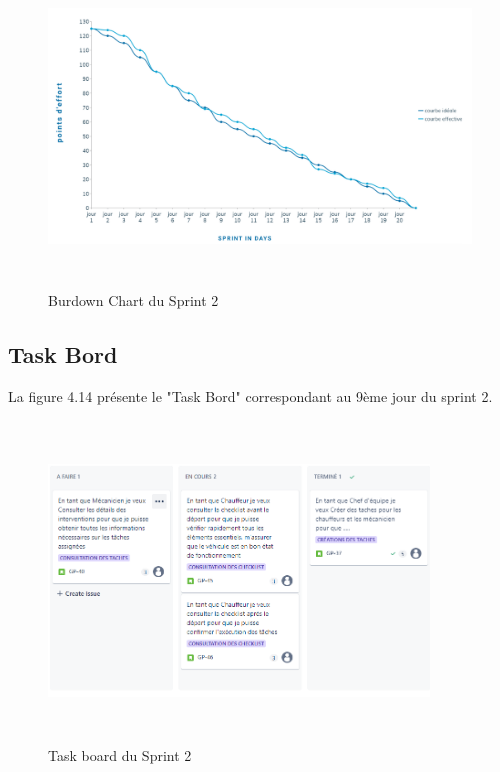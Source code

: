 \bigskip
\begin{figure}[h!]
  \centering
  \includegraphics[width=1\textwidth, height=8.5cm]{chap4.images/Burndown chart sprint 2.png}
  \caption{ Burdown Chart du Sprint 2}

\end{figure}


\subsection{Task Bord}

La figure 4.14 présente le "Task Bord" correspondant au 9ème jour du sprint 2.

\begin{figure}[h!]
  \centering
  \includegraphics[width=0.9\textwidth, height=8.5cm]{chap4.images/task board sprint 2.png}
  \caption{ Task board du Sprint 2 }

\end{figure}

